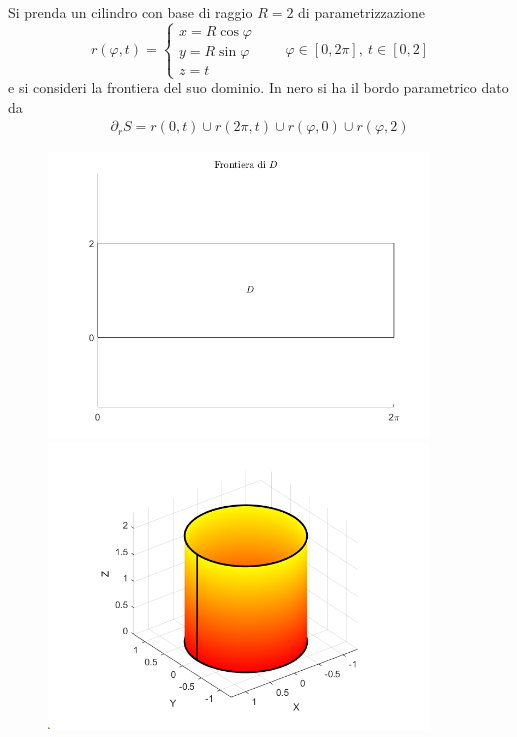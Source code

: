  \begin{example}
     Si prenda un cilindro con base di raggio $R=2$ di parametrizzazione
     \begin{equation*}
         r(\varphi,t)=\begin{cases}
             x= R \cos \varphi\\
             y= R \sin \varphi\\
             z=t
         \end{cases}
         \qquad \varphi \in [0, 2\pi],\ t \in [0, 2]
     \end{equation*}
     e si consideri la frontiera del suo dominio.
     In nero si ha il bordo parametrico dato da
     \begin{align*}
         \partial_r S = r(0,t) \cup r(2\pi, t) \cup r(\varphi, 0) \cup r(\varphi, 2)
     \end{align*}
     \begin{figure}[H]
     \begin{minipage}{0.4\textwidth}
     \includegraphics[width=0.9\textwidth]{Capitoli/Capitolo6/Frontiera D.png}
     \end{minipage}
     \centering
     \begin{minipage}{0.5\textwidth}     \includegraphics[width=0.9\textwidth]{Capitoli/Capitolo6/Bordo parametrico cilindro.png}
     \end{minipage}
     \end{figure}
 \end{example}
